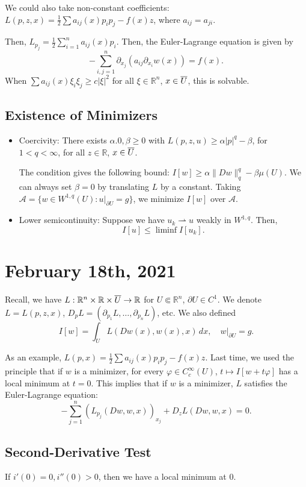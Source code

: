 \documentclass[12pt]{scrartcl}
\newcommand{\R}{\mathbb{R}}
\newcommand{\<}{\langle}
\renewcommand{\>}{\rangle}
\let \phi \varphi
\let \mc \mathcal
\begin{document}
We could also take non-constant coefficients: $L(p, z, x) = \frac{1}{2}\sum a_{ij}(x) p_i p_j - f(x)z$, where $a_{ij} = a_{ji}$.

Then, $L_{p_j} = \frac{1}{2}\sum_{i=1}^n a_{ij}(x) p_i $.  Then, the Euler-Lagrange equation is given by
$$-\sum_{i, j = 1}^n \partial_{x_j}(a_{ij }\partial_{x_i}w(x)) = f(x).$$
When $\sum a_{ij}(x) \xi_i \xi_j \ge c|\xi|^2$ for all $\xi \in \R^n$, $x \in \overline{U}$, this is solvable.  

\subsection{Existence of Minimizers}
\begin{itemize}
\item Coercivity: There exists $\alpha . 0, \beta \ge 0$ with $L(p, z, u) \ge \alpha |p|^q - \beta$, for $1 < q < \infty$, for all $z \in \R$, $x \in \overline U$.  

The condition gives the following bound: $I[w] \ge \alpha \|Dw\|_q^q - \beta \mu(U)$.  We can always set $\beta = 0$ by translating $L$ by a constant.  Taking $\mc A = \{w \in W^{1, q}(U) : u\vert_{\partial U} = g\}$, we minimize $I[w]$ over $\mc A$.
\item Lower semicontinuity: Suppose we have $u_k \rightharpoonup u$ weakly in $W^{1, q}$.  Then, $$I[u] \le \liminf I[u_k].$$
\end{itemize}
\pagebreak
\section{February 18th, 2021}
Recall, we have $L: \R^n \times \R \times \ol{U} \to \R$ for $U \Subset \R^n$, $\partial U \in C^1$.  We denote $L = L(p, z, x)$, $D_pL = (\partial_{p_1}L, \dots, \partial_{p_n}L)$, etc.  We also defined 
$$I[w] = \int_U L(Dw(x), w(x), x)\,dx, \quad w\vert_{\partial U} = g.$$

As an example, $L(p, x) = \frac{1}{2}\sum a_{ij}(x) p_ip_j - f(x)z$.  Last time, we used the principle that if $w$ is a minimizer, for every $\phi \in C_c^\infty(U)$, $t \mapsto I[w + t\phi]$ has a local minimum at $t = 0$.  This implies that if $w$ is a minimizer, $L$ satisfies the Euler-Lagrange equation:
$$-\sum_{j=1}^n (L_{p_j}(Dw, w, x))_{x_j} + D_zL(Dw, w, x) = 0.$$

\subsection{Second-Derivative Test}
If $i'(0) = 0, i''(0) > 0$, then we have a local minimum at $0$.
\end{document}
